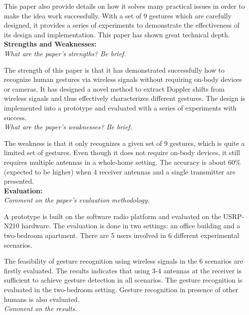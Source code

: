 \documentclass[11pt, oneside]{article}   	%
\begin{document}
This paper also provide details on how it solves many practical issues in order to make the idea work successfully. With a set of 9 gestures which are carefully designed,  it provides a series of experiments to demonstrate the effectiveness of its design and implementation. This paper has shown great technical depth.\\


\noindent \textbf{Strengths and Weaknesses:}\\
\emph{What are the paper’s strengths? Be brief.}

The strength of this paper is that it has demonstrated successfully how to recognize human gestures via wireless signals without requiring on-body devices or cameras. It has designed a novel method to extract Doppler shifts from wireless signals and thus effectively characterizes different gestures. The design is implemented into a prototype and evaluated with a series of experiments with success.\\



\noindent \emph{What are the paper's weaknesses? Be brief.}

The weakness is that it only recognizes a given set of 9 gestures, which is quite a limited set of gestures. Even though it does not require on-body devices, it still requires multiple antennas in a whole-home setting. The accuracy is about 60\% (expected to be higher) when 4 receiver antennas and a single transmitter are presented.\\


\noindent \textbf{Evaluation:}\\
\emph{Comment on the paper's evaluation methodology.}

A prototype is built on the software radio platform and evaluated on the USRP-N210 hardware. The evaluation is done in two settings: an office building and a two-bedroom apartment. There are 5 users involved in  6 different experimental scenarios. 

The feasibility of gesture recognition using wireless signals in the 6 scenarios are firstly evaluated. The results indicates that using 3-4 antennas at the receiver is sufficient to achieve gesture detection in all scenarios. The gesture recognition is evaluated in the two-bedroom setting. Gesture recognition in presence of other humans is also evaluated. \\

\noindent \emph{Comment on the results.}
\end{document}
